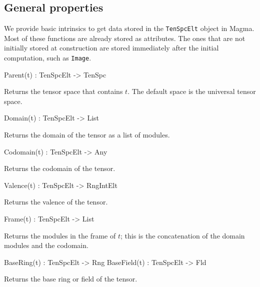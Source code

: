 \subsection{General properties}

We provide basic intrinsics to get data stored in the \texttt{TenSpcElt} object in Magma.
Most of these functions are already stored as attributes. 
The ones that are not initially stored at construction are stored immediately after the initial computation, such as \texttt{Image}.

\begin{intrinsics}
Parent(t) : TenSpcElt -> TenSpc
\end{intrinsics}

Returns the tensor space that contains $t$. The default space is the universal 
tensor space.

\begin{intrinsics}
Domain(t) : TenSpcElt -> List
\end{intrinsics}

Returns the domain of the tensor as a list of modules.

\begin{intrinsics}
Codomain(t) : TenSpcElt -> Any
\end{intrinsics}

Returns the codomain of the tensor.

\begin{intrinsics}
Valence(t) : TenSpcElt -> RngIntElt
\end{intrinsics}

Returns the valence of the tensor.

\begin{intrinsics}
Frame(t) : TenSpcElt -> List
\end{intrinsics}

Returns the modules in the frame of $t$; this is the concatenation of
the domain modules and the codomain.

\begin{intrinsics}
BaseRing(t) : TenSpcElt -> Rng
BaseField(t) : TenSpcElt -> Fld
\end{intrinsics}

Returns the base ring or field of the tensor.

